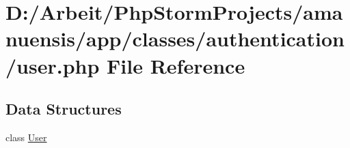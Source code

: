 \hypertarget{user_8php}{}\section{D\+:/\+Arbeit/\+Php\+Storm\+Projects/amanuensis/app/classes/authentication/user.php File Reference}
\label{user_8php}
\subsection*{Data Structures}
\begin{DoxyCompactItemize}
\item 
class \hyperlink{class_user}{User}
\end{DoxyCompactItemize}
